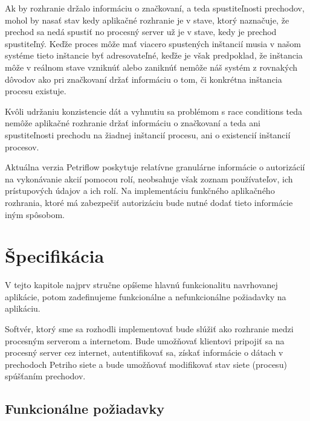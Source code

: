Ak by rozhranie držalo informáciu o značkovaní, a teda spustiteľnosti prechodov, mohol by nasať stav kedy aplikačné rozhranie je v stave, ktorý naznačuje, že prechod sa nedá spustiť no procesný server už je v stave, kedy je prechod spustiteľný. Keďže proces môže mať viacero spustených inštancií musia v našom systéme tieto inštancie byť adresovateľné, keďže je však predpoklad, že inštancia môže v reálnom stave vzniknúť alebo zaniknúť nemôže náš systém z rovnakých dôvodov ako pri značkovaní držať informáciu o tom, či konkrétna inštancia procesu existuje. 

Kvôli udržaniu konzistencie dát a vyhnutiu sa problémom s race conditions teda nemôže aplikačné rozhranie držať informáciu o značkovaní a teda ani spustiteľnosti prechodu na žiadnej inštancií procesu, ani o existencií inštancií procesov.

Aktuálna verzia Petriflow poskytuje relatívne granulárne informácie o autorizácií na vykonávanie akcií pomocou rolí, neobsahuje však zoznam používateľov, ich prístupových údajov a ich rolí. Na implementáciu funkčného aplikačného rozhrania, ktoré má zabezpečiť autorizáciu bude nutné dodať tieto informácie iným spôsobom.


\section{Špecifikácia}

V tejto kapitole najprv stručne opíšeme hlavnú funkcionalitu navrhovanej aplikácie, potom zadefinujeme funkcionálne a nefunkcionálne požiadavky na aplikáciu.

Softvér, ktorý sme sa rozhodli implementovať bude slúžiť ako rozhranie medzi procesným serverom a internetom. Bude umožňovať klientovi pripojiť sa na procesný server cez internet, autentifikovať sa, získať informácie o dátach v prechodoch Petriho siete a bude umožňovať modifikovať stav siete (procesu) spúšťaním prechodov.

\subsection{Funkcionálne požiadavky}

